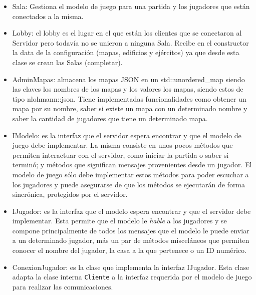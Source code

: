 \documentclass[titlepage,a4paper,12pt]{article}
\begin{document}
\begin{itemize}
\item Sala: Gestiona el modelo de juego para una partida y los jugadores que están conectados a la misma.

\item Lobby: el lobby es el lugar en el que están los clientes que se conectaron al Servidor pero todavía no se unieron a ninguna Sala. Recibe en el constructor la data de la configuración (mapas, edificios y ejércitos) ya que desde esta clase se crean las Salas (completar).

\item AdminMapas: almacena los mapas JSON en un std::unordered\_map siendo las claves los nombres de los mapas y los valores los mapas, siendo estos de tipo nlohmann::json. Tiene implementadas funcionalidades como obtener un mapa por su nombre, saber si existe un mapa con un determinado nombre y saber la cantidad de jugadores que tiene un determinado mapa.

\item IModelo: es la interfaz que el servidor espera encontrar y que el modelo de juego debe implementar. La misma consiste en unos pocos métodos que permiten interactuar con el servidor, como iniciar la partida o saber si terminó; y métodos que significan mensajes provenientes desde un jugador. El modelo de juego sólo debe implementar estos métodos para poder escuchar a los jugadores y puede asegurarse de que los métodos se ejecutarán de forma sincrónica, protegidos por el servidor.

\item IJugador: es la interfaz que el modelo espera encontrar y que el servidor debe implementar. Esta permite que el modelo le \textit{hable} a los jugadores y se compone principalmente de todos los mensajes que el modelo le puede enviar a un determinado jugador, más un par de métodos misceláneos que permiten conocer el nombre del jugador, la casa a la que pertenece o un ID numérico.

\item ConexionJugador: es la clase que implementa la interfaz IJugador. Esta clase adapta la clase interna \texttt{Cliente} a la interfaz requerida por el modelo de juego para realizar las comunicaciones.

\end{itemize}
\end{document}
